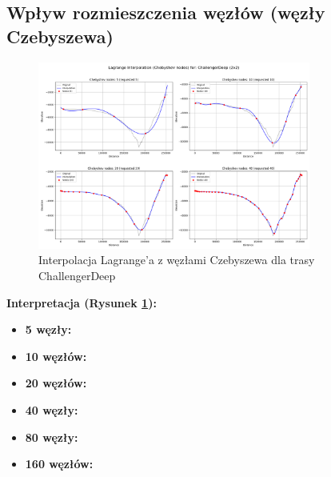 \documentclass[11pt,a4paper]{article}
\begin{document}
\subsection{Wpływ rozmieszczenia węzłów (węzły Czebyszewa)}
\begin{figure}[H]
    \centering
    \includegraphics[width=0.8\textwidth]{plots/ChallengerDeep_Lagrange_Chebyshev_2x2.png}
    \caption{Interpolacja Lagrange'a z węzłami Czebyszewa dla trasy ChallengerDeep}
    \label{fig:challengerdeep_chebyshev}
\end{figure}
\textbf{Interpretacja (Rysunek \ref{fig:challengerdeep_chebyshev}):} 
\begin{itemize}
    \item \textbf{5 węzły:}
    \item \textbf{10 węzłów:}
    \item \textbf{20 węzłów:}
    \item \textbf{40 węzły:} 
    \item \textbf{80 węzły:} 
    \item \textbf{160 węzłów:} 
\end{itemize}
\end{document}
